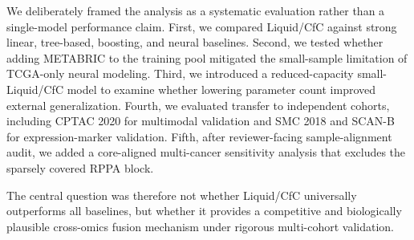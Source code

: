We deliberately framed the analysis as a systematic evaluation rather than a single-model performance claim. First, we compared Liquid/CfC against strong linear, tree-based, boosting, and neural baselines. Second, we tested whether adding METABRIC to the training pool mitigated the small-sample limitation of TCGA-only neural modeling. Third, we introduced a reduced-capacity small-Liquid/CfC model to examine whether lowering parameter count improved external generalization. Fourth, we evaluated transfer to independent cohorts, including CPTAC 2020 for multimodal validation and SMC 2018 and SCAN-B for expression-marker validation. Fifth, after reviewer-facing sample-alignment audit, we added a core-aligned multi-cancer sensitivity analysis that excludes the sparsely covered RPPA block.

The central question was therefore not whether Liquid/CfC universally outperforms all baselines, but whether it provides a competitive and biologically plausible cross-omics fusion mechanism under rigorous multi-cohort validation.
